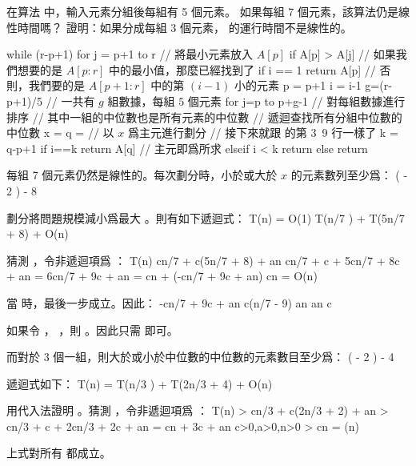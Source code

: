 
\startEXERCISE
在算法  中，輸入元素分組後每組有 5 個元素。
如果每組 7 個元素，該算法仍是線性時間嗎？
證明：如果分成每組 3 個元素，  的運行時間不是線性的。

\startCLRSCODE
while (r-p+1)  
	for j = p+1 to r	// 將最小元素放入 $A[p]$
		if A[p] > A[j]
	// 如果我們想要的是 $A[p:r]$ 中的最小值，那麼已經找到了
	if i == 1
		return A[p]
	// 否則，我們要的是 $A[p+1:r]$ 中的第 $(i-1)$ 小的元素
	p = p+1
	i = i-1
g=(r-p+1)/5	// 一共有 $g$ 組數據，每組 $5$ 個元素
for j=p to p+g-1	// 對每組數據進行排序
// 其中一組的中位數也是所有元素的中位數
// 遞迴查找所有分組中位數的中位數
x = 
q = 	// 以 $x$ 爲主元進行劃分
// 接下來就跟  的第 3~9 行一樣了
k = q-p+1
if i==k
	return A[q]	// 主元即爲所求
elseif i < k
	return 
else
	return 
\stopCLRSCODE
\stopEXERCISE

\startANSWER
每組 7 個元素仍然是線性的。每次劃分時，小於或大於 $x$ 的元素數列至少爲：
 \left(\left\lceil {} \left\lceil {} \right\rceil \right\rceil
           - 2 \right) \ge {} - 8
\stopformula

劃分將問題規模減小爲最大 。則有如下遞迴式：
\startformula
T(n) = \startmathcases
 \NC O(1) \NC {} \NR
 \NC T(\lceil n/7 \rceil) + T(5n/7 + 8) + O(n) \NC {} \NR
\stopmathcases
\stopformula

猜測 ，令非遞迴項爲 ：
\startsplitformula\startmathalignment
\NC T(n) \NC \le c\lceil n/7 \rceil + c(5n/7 + 8) + an \NR
\NC \NC \le cn/7 + c + 5cn/7 + 8c + an \NR
\NC \NC = 6cn/7 + 9c + an \NR
\NC \NC = cn + (-cn/7 + 9c + an) \NR
\NC \NC \le cn \NR
\NC \NC = O(n) \NR
\stopmathalignment\stopsplitformula

當  時，最後一步成立。因此：
\startsplitformula\startmathalignment[n=1]
\NC -cn/7 + 9c + an  \NR
\NC \Downarrow \NR
\NC c(n/7 - 9) \ge an \NR
\NC \Downarrow \NR
\NC {} \ge an \NR
\NC \Downarrow \NR
\NC c \ge {} \NR
\stopmathalignment\stopsplitformula

如果令 ， ，則 。因此只需  即可。

而對於 3 個一組，則大於或小於中位數的中位數的元素數目至少爲：
 \left(\lceil {} \left\lceil {} \rceil \right\rceil
           - 2 \right) \ge {} - 4
\stopformula

遞迴式如下：
\startformula
T(n) = T(\lceil n/3 \rceil) + T(2n/3 + 4) + O(n)
\stopformula

用代入法證明 。猜測 ，令非遞迴項爲 ：
\startsplitformula\startmathalignment
\NC T(n) \NC > c\lceil n/3 \rceil + c(2n/3 + 2) + an \NR
\NC \NC > cn/3 + c + 2cn/3 + 2c + an \NR
\NC \NC = cn + 3c + an \qquad c>0,a>0,n>0\NR
\NC \NC > cn \NR
\NC \NC = \omega(n) \NR
\stopmathalignment\stopsplitformula

上式對所有  都成立。
\stopANSWER
